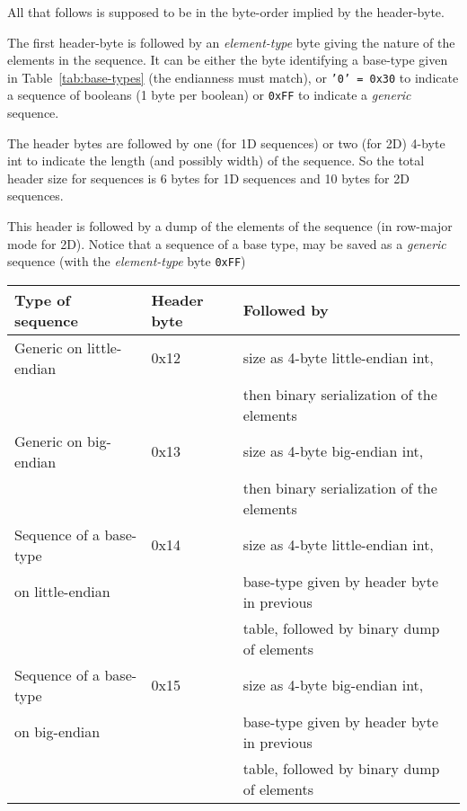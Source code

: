 \documentclass[11pt]{book}
\begin{document}
{All that follows is supposed to be in the byte-order implied by the header-byte.

The first header-byte is followed by an {\em element-type} byte giving the nature
of the elements in the sequence.  It can be either the byte identifying a
base-type given in Table~\ref{tab:base-types} (the endianness must match),
or {\tt '0' = 0x30} to indicate a sequence of booleans (1 byte per boolean) 
or {\tt 0xFF} to indicate a {\em generic} sequence.

The header bytes are followed by one (for 1D sequences) or two (for 2D)
4-byte int to indicate the length (and possibly width) of the sequence.
So the total header size for sequences is 6 bytes for 1D sequences and 10
bytes for 2D sequences.

This header is followed by a dump of the elements of the sequence (in
row-major mode for 2D).  Notice that a sequence of a base type, may be
saved as a {\em generic} sequence (with the {\em element-type} byte {\tt 0xFF})



\begin{tabular}{|l|l|l|} \hline
Type of sequence         & Header byte & Followed by \\ \hline
Generic on little-endian & 0x12        & size as 4-byte little-endian int, \\
                         &             & then binary serialization of the elements \\ \hline
Generic on big-endian    & 0x13        & size as 4-byte big-endian int, \\ 
                         &             & then binary serialization of the elements \\ \hline
Sequence of a base-type  & 0x14        & size as 4-byte little-endian int, \\ 
on little-endian         &             & base-type given by header byte in previous \\
                         &             & table, followed by binary dump of elements \\ \hline
Sequence of a base-type  & 0x15        & size as 4-byte big-endian int, \\ 
on big-endian            &             & base-type given by header byte in previous \\
                         &             & table, followed by binary dump of elements \\ \hline
\end{tabular}





}
\end{document}
